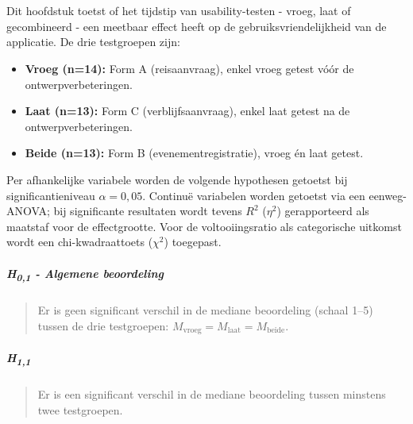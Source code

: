 
\chapter{}%
\label{ch:vergelijkende-analyse}

\section{}

Dit hoofdstuk toetst of het tijdstip van usability-testen - vroeg, laat of gecombineerd - een meetbaar effect heeft op de gebruiksvriendelijkheid van de applicatie. De drie testgroepen zijn:

\begin{itemize}
  \item \textbf{Vroeg (n=14):} Form A (reisaanvraag), enkel vroeg getest vóór de ontwerpverbeteringen.
  \item \textbf{Laat (n=13):} Form C (verblijfsaanvraag), enkel laat getest na de ontwerpverbeteringen.
  \item \textbf{Beide (n=13):} Form B (evenementregistratie), vroeg én laat getest.
\end{itemize}

Per afhankelijke variabele worden de volgende hypothesen getoetst bij significantieniveau $\alpha = 0{,}05$. Continuë variabelen worden getoetst via een eenweg-ANOVA; bij significante resultaten wordt tevens $R^2$ ($\eta^2$) gerapporteerd als maatstaf voor de effectgrootte. Voor de voltooiingsratio als categorische uitkomst wordt een chi-kwadraattoets ($\chi^2$) toegepast.

\paragraph{H\textsubscript{0,1} - Algemene beoordeling}
\begin{quote}
  Er is geen significant verschil in de mediane beoordeling (schaal 1–5) tussen de drie testgroepen: $M_{\text{vroeg}} = M_{\text{laat}} = M_{\text{beide}}$.
\end{quote}
\paragraph{H\textsubscript{1,1}}
\begin{quote}
  Er is een significant verschil in de mediane beoordeling tussen minstens twee testgroepen.
\end{quote}

